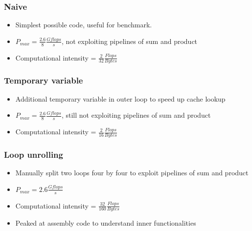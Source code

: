 \documentclass{beamer}
\begin{document}
\begin{frame}
\frametitle{Naive}
\begin{itemize}
\item  Simplest possible code, useful for benchmark.
\item  $P_{max} = \frac{2.6}{8}\frac{Gflops}{s}$, not exploiting pipelines of sum and product
\item  Computational intensity = $\frac{2}{32}\frac{Flops}{Bytes}$
\end{itemize}
\end{frame}

\begin{frame}
\frametitle{Temporary variable}
\begin{itemize}
\item Additional temporary variable in outer loop to speed up cache lookup
\item  $P_{max} = \frac{2.6}{8}\frac{Gflops}{s}$, still not exploiting pipelines of sum and product
\item Computational intensity = $\frac{2}{16}\frac{Flops}{Bytes}$
\end{itemize}
\end{frame}

\begin{frame}
\frametitle{Loop unrolling}
\begin{itemize}
\item Manually split two loops four by four to exploit pipelines of sum and product
\item $P_{max} =2.6\frac{Gflops}{s}$ 
\item Computational intensity = $\frac{32}{160}\frac{Flops}{Bytes}$
\item Peaked at assembly code to understand inner functionalities 
\end{itemize}
\end{frame}

\end{document}
